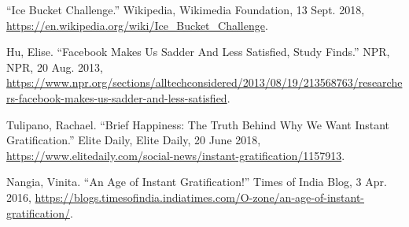 \documentclass[a4paper, 11pt]{article}
\begin{document}
\begin{thebibliography}{X}
  “Ice Bucket Challenge.” Wikipedia, Wikimedia Foundation, 13 Sept. 2018, \href{https://en.wikipedia.org/wiki/Ice\_Bucket\_Challenge}{https://en.wikipedia.org/wiki/Ice\_Bucket\_Challenge}.

  Hu, Elise. “Facebook Makes Us Sadder And Less Satisfied, Study Finds.” NPR, NPR, 20 Aug. 2013, \href{https://www.npr.org/sections/alltechconsidered/2013/08/19/213568763/researchers-facebook-makes-us-sadder-and-less-satisfied}{https://www.npr.org/sections/alltechconsidered/2013/08/19/213568763/researchers-facebook-makes-us-sadder-and-less-satisfied}.

  Tulipano, Rachael. “Brief Happiness: The Truth Behind Why We Want Instant Gratification.” Elite Daily, Elite Daily, 20 June 2018, \href{https://www.elitedaily.com/social-news/instant-gratification/1157913}{https://www.elitedaily.com/social-news/instant-gratification/1157913}.

  Nangia, Vinita. “An Age of Instant Gratification!” Times of India Blog, 3 Apr. 2016, \href{https://blogs.timesofindia.indiatimes.com/O-zone/an-age-of-instant-gratification/}{https://blogs.timesofindia.indiatimes.com/O-zone/an-age-of-instant-gratification/}.


\end{thebibliography}
\end{document}

